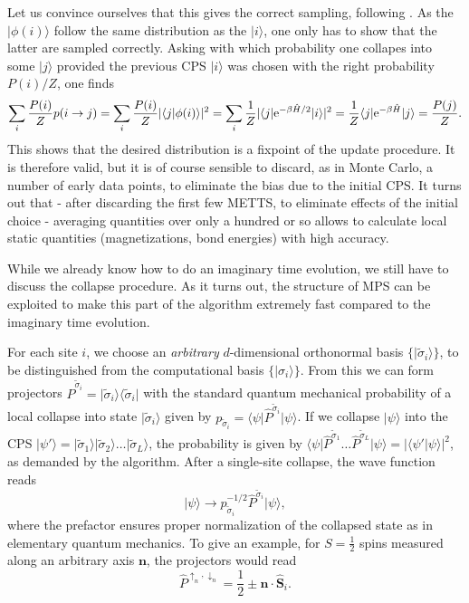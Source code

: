 \documentclass[a4paper,10pt,oneside,onecolumn,1p,times]{elsarticle}
\newcommand{\eul}{{\rm e }}
\newcommand{\bra}[1]{\mbox{$\langle #1  |$}}
\newcommand{\ket}[1]{\mbox{$| #1  \rangle$}}
\newcommand{\braket}[2]{\mbox{$\langle #1  | #2 \rangle$}} 	%
\begin{document}
Let us convince ourselves that this gives the correct sampling, following \cite{Stoudenmire10}. As the $\ket{\phi(i)}$ follow the same distribution as the $\ket{i}$, one only has to show that the latter are sampled correctly. Asking with which probability one collapes into some $\ket{j}$ provided the previous CPS $\ket{i}$ was chosen with the right probability $P(i)/Z$, one finds 
\begin{equation}
\sum_i \frac{P(i)}{Z} p(i\rightarrow j) = \sum_i \frac{P(i)}{Z} | \braket{j}{\phi(i)} |^2 = \sum_i
\frac{1}{Z} | \bra{j} \eul^{-\beta \hat{H}/2} \ket{i}|^2 = \frac{1}{Z} \bra{j} \eul^{-\beta\hat{H}} \ket{j} = \frac{P(j)}{Z}.
\end{equation}
This shows that the desired distribution is a fixpoint of the update procedure. It is therefore valid, but it is of course sensible to discard, as in Monte Carlo, a number of early data points, to eliminate the bias due to the initial CPS.  It turns out that - after discarding the first few METTS, to eliminate effects of the initial choice - averaging quantities over only a hundred or so allows to calculate local static quantities (magnetizations, bond energies) with high accuracy.

While we already know how to do an imaginary time evolution, we still have to discuss the collapse procedure. As it turns out, the structure of MPS can be exploited to make this part of the algorithm extremely fast compared to the imaginary time evolution.

For each site $i$, we choose an {\em arbitrary} $d$-dimensional orthonormal basis $\{ \ket{\tilde{\sigma}_i} \}$, to be distinguished from the computational basis $\{ \ket{\sigma_i} \}$. From this we can form projectors $\hat{P}^{\tilde{\sigma}_i} = \ket{\tilde{\sigma}_i} \bra{\tilde{\sigma}_i}$ with the standard quantum mechanical probability of a local collapse into state $\ket{\tilde{\sigma}_i}$ given by
$p_{\tilde{\sigma}_i} =\bra{\psi} \hat{P}^{\tilde{\sigma}_i} \ket{\psi}$. If we collapse $\ket{\psi}$ into the CPS
$\ket{\psi'} = \ket{ \tilde{\sigma}_1} \ket{ \tilde{\sigma}_2} \ldots \ket{ \tilde{\sigma}_L}$, the probability is given by  $\bra{\psi} \hat{P}^{\tilde{\sigma}_1} \ldots \hat{P}^{\tilde{\sigma}_L} \ket{\psi} = | \braket{\psi'}{\psi} |^2$, as demanded by the algorithm. After a single-site collapse, the wave function reads
\begin{equation}
\ket{\psi} \rightarrow  p_{\tilde{\sigma}_i}^{-1/2} \hat{P}^{\tilde{\sigma}_i}\ket{\psi} ,
\end{equation}
where the prefactor ensures proper normalization of the collapsed state as in elementary quantum mechanics. To give an example, for $S=\frac{1}{2}$ spins measured along an arbitrary axis ${\mathbf n}$, the projectors would read
\begin{equation}
\hat{P}^{\uparrow_n,\downarrow_n} = \frac{1}{2} \pm {\mathbf n} \cdot \hat{{\mathbf S}}_i .
\end{equation}
\end{document}
